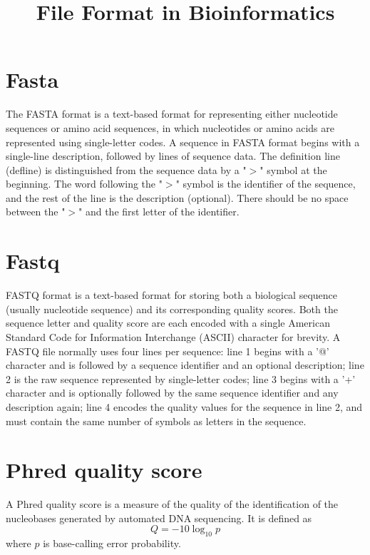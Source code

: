 \documentclass[11pt]{article}
\title{File Format in Bioinformatics}
\date{}
\begin{document}
  \maketitle

  \linenumbers
\section{Fasta}
The FASTA format is a text-based format for representing either nucleotide sequences or amino acid sequences, in which nucleotides or amino acids are represented using single-letter codes. 
A sequence in FASTA format begins with a single-line description, followed by lines of sequence data. 
The definition line (defline) is distinguished from the sequence data by a "$>$" symbol at the beginning. 
The word following the "$>$" symbol is the identifier of the sequence, and the rest of the line is the description (optional). 
There should be no space between the "$>$" and the first letter of the identifier. 

\section{Fastq}
FASTQ format is a text-based format for storing both a biological sequence (usually nucleotide sequence) and its corresponding quality scores. 
Both the sequence letter and quality score are each encoded with a single American Standard Code for Information Interchange (ASCII) character for brevity. 
A FASTQ file normally uses four lines per sequence: 
line 1 begins with a '@' character and is followed by a sequence identifier and an optional description; 
line 2 is the raw sequence represented by single-letter codes; 
line 3 begins with a '+' character and is optionally followed by the same sequence identifier and any description again; 
line 4 encodes the quality values for the sequence in line 2, and must contain the same number of symbols as letters in the sequence.

\section{Phred quality score}
A Phred quality score is a measure of the quality of the identification of the nucleobases generated by automated DNA sequencing. 
It is defined as 
\begin{equation}
  Q = -10\log_{10}p
\end{equation}
where $p$ is base-calling error probability. 
\end{document}
